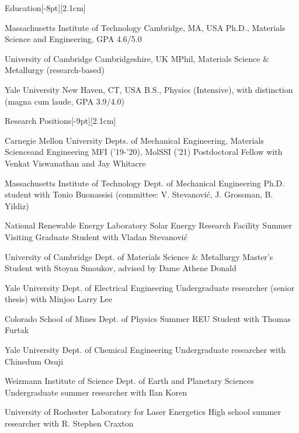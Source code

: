 \documentclass{cv} %
\begin{document}
\thispagestyle{empty}
\begin{cvSection}{Education}[-8pt][2.1cm]

     {Massachusetts Institute of Technology}
     {Cambridge, MA, USA}
     {Ph.D., Materials Science and Engineering, GPA 4.6/5.0}

     {University of Cambridge}
     {Cambridgeshire, UK}
     {MPhil, Materials Science \& Metallurgy (research-based)}

     {Yale University}
     {New Haven, CT, USA}
     {B.S., Physics (Intensive), with distinction (magna cum laude, GPA 3.9/4.0)}


\end{cvSection}

\begin{cvSection}{Research Positions}[-9pt][2.1cm]

    {Carnegie Mellon University}
    {Depts. of Mechanical Engineering, Materials Science\newline and Engineering}
    {MFI ('19-'20), MolSSI ('21) Postdoctoral Fellow with Venkat Viswanathan and Jay Whitacre}

    {Massachusetts Institute of Technology}
    {Dept. of Mechanical Engineering}
    {Ph.D. student with Tonio Buonassisi (committee: V. Stevanovi\'c, J. Grossman, B. Yildiz)}

    {National Renewable Energy Laboratory}
    {Solar Energy Research Facility}
    {Summer Visiting Graduate Student with Vladan Stevanovi\'c}

    {University of Cambridge}
    {Dept. of Materials Science \& Metallurgy}
    {Master's Student with Stoyan Smoukov, advised by Dame Athene Donald}

    {Yale University}
    {Dept. of Electrical Engineering}
    {Undergraduate researcher (senior thesis) with Minjoo Larry Lee}

    {Colorado School of Mines}
    {Dept. of Physics}
    {Summer REU Student with Thomas Furtak}

    {Yale University}
    {Dept. of Chemical Engineering}
    {Undergraduate researcher with Chinedum Osuji}

    {Weizmann Institute of Science}
    {Dept. of Earth and Planetary Sciences}
    {Undergraduate summer researcher with Ilan Koren}

    {University of Rochester}
    {Laboratory for Laser Energetics}
    {High school summer researcher with R. Stephen Craxton}

\end{cvSection}
\end{document}
